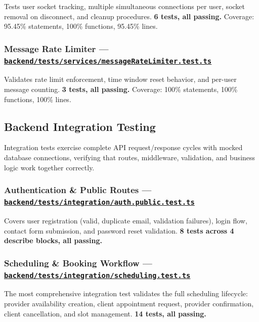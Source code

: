 \documentclass[12pt,letterpaper]{article}
\newcommand{\ghrepo}{https://github.com/omniV1/lunaraCare}
\begin{document}
Tests user socket tracking, multiple simultaneous connections per user, socket removal on disconnect, and cleanup procedures. \textbf{6 tests, all passing.} Coverage: 95.45\% statements, 100\% functions, 95.45\% lines.

\subsubsection{Message Rate Limiter --- \href{\ghrepo/blob/main/backend/tests/services/messageRateLimiter.test.ts}{\texttt{backend/tests/services/messageRateLimiter.test.ts}}}

Validates rate limit enforcement, time window reset behavior, and per-user message counting. \textbf{3 tests, all passing.} Coverage: 100\% statements, 100\% functions, 100\% lines.

\subsection{Backend Integration Testing}

Integration tests exercise complete API request/response cycles with mocked database connections, verifying that routes, middleware, validation, and business logic work together correctly.

\subsubsection{Authentication \& Public Routes --- \href{\ghrepo/blob/main/backend/tests/integration/auth.public.test.ts}{\texttt{backend/tests/integration/auth.public.test.ts}}}

Covers user registration (valid, duplicate email, validation failures), login flow, contact form submission, and password reset validation. \textbf{8 tests across 4 describe blocks, all passing.}

\subsubsection{Scheduling \& Booking Workflow --- \href{\ghrepo/blob/main/backend/tests/integration/scheduling.test.ts}{\texttt{backend/tests/integration/scheduling.test.ts}}}

The most comprehensive integration test validates the full scheduling lifecycle: provider availability creation, client appointment request, provider confirmation, client cancellation, and slot management. \textbf{14 tests, all passing.}
\end{document}

